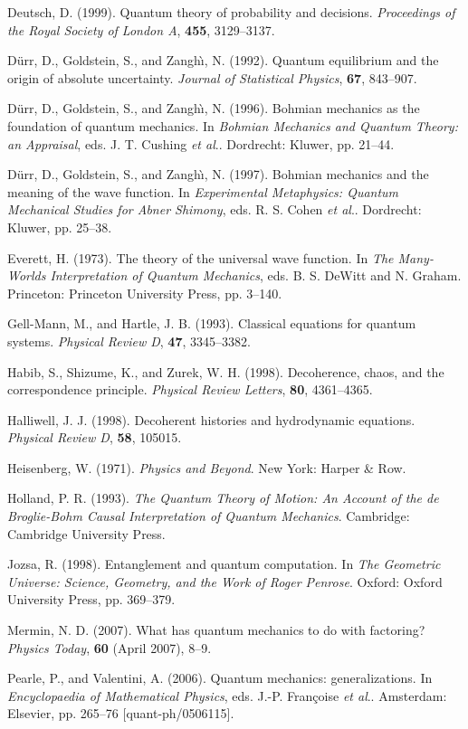 \documentclass{article}%
\begin{document}
Deutsch, D. (1999). Quantum theory of probability and decisions.
\textit{Proceedings of the Royal Society of London A}, \textbf{455}, 3129--3137.

D\"{u}rr, D., Goldstein, S., and Zangh\`{\i}, N. (1992). Quantum equilibrium
and the origin of absolute uncertainty. \textit{Journal of Statistical
Physics}, \textbf{67}, 843--907.

D\"{u}rr, D., Goldstein, S., and Zangh\`{\i}, N. (1996). Bohmian mechanics as
the foundation of quantum mechanics. In \textit{Bohmian Mechanics and Quantum
Theory: an Appraisal}, eds. J. T. Cushing \textit{et al}.. Dordrecht: Kluwer,
pp. 21--44.

D\"{u}rr, D., Goldstein, S., and Zangh\`{\i}, N. (1997). Bohmian mechanics and
the meaning of the wave function. In \textit{Experimental Metaphysics: Quantum
Mechanical Studies for Abner Shimony}, eds. R. S. Cohen \textit{et al}..
Dordrecht: Kluwer, pp. 25--38.

Everett, H. (1973). The theory of the universal wave function. In \textit{The
Many-Worlds Interpretation of Quantum Mechanics}, eds. B. S. DeWitt and N.
Graham. Princeton: Princeton University Press, pp. 3--140.

Gell-Mann, M., and Hartle, J. B. (1993). Classical equations for quantum
systems. \textit{Physical Review D}, \textbf{47}, 3345--3382.

Habib, S., Shizume, K., and Zurek, W. H. (1998). Decoherence, chaos, and the
correspondence principle. \textit{Physical Review Letters}, \textbf{80}, 4361--4365.

Halliwell, J. J. (1998). Decoherent histories and hydrodynamic equations.
\textit{Physical Review D}, \textbf{58}, 105015.

Heisenberg, W. (1971). \textit{Physics and Beyond}. New York: Harper {\&} Row.

Holland, P. R. (1993). \textit{The Quantum Theory of Motion: An Account of the
de Broglie-Bohm Causal Interpretation of Quantum Mechanics}. Cambridge:
Cambridge University Press.

Jozsa, R. (1998). Entanglement and quantum computation. In \textit{The
Geometric Universe: Science, Geometry, and the Work of Roger Penrose}. Oxford:
Oxford University Press, pp. 369--379.

Mermin, N. D. (2007). What has quantum mechanics to do with factoring?
\textit{Physics Today}, \textbf{60} (April 2007), 8--9.

Pearle, P., and Valentini, A. (2006). Quantum mechanics: generalizations. In
\textit{Encyclopaedia of Mathematical Physics}, eds. J.-P. Fran\c{c}oise
\textit{et al}.. Amsterdam: Elsevier, pp. 265--76 [quant-ph/0506115].
\end{document}
